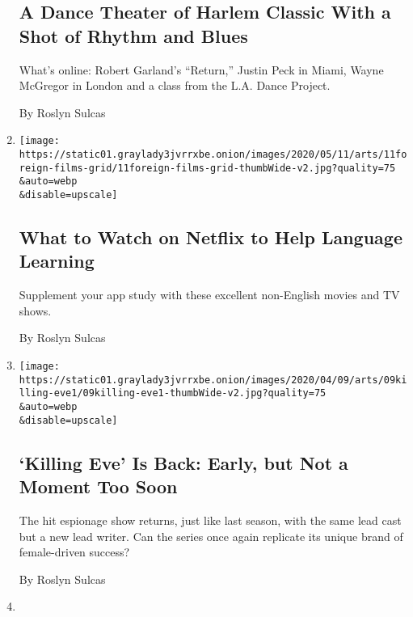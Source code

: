 \begin{enumerate}
  \hypertarget{a-dance-theater-of-harlem-classic-with-a-shot-of-rhythm-and-blues}{%
  \subsection{A Dance Theater of Harlem Classic With a Shot of Rhythm
  and
  Blues}\label{a-dance-theater-of-harlem-classic-with-a-shot-of-rhythm-and-blues}}

  What's online: Robert Garland's ``Return,'' Justin Peck in Miami,
  Wayne McGregor in London and a class from the L.A. Dance Project.

  By Roslyn Sulcas
\item
  \href{/2020/05/11/arts/television/netflix-foreign-films.html}{}

  \texttt{[image: https://static01.graylady3jvrrxbe.onion/images/2020/05/11/arts/11foreign-films-grid/11foreign-films-grid-thumbWide-v2.jpg?quality=75\\\&auto=webp\\\&disable=upscale]}

  \hypertarget{what-to-watch-on-netflix-to-help-language-learning}{%
  \subsection{What to Watch on Netflix to Help Language
  Learning}\label{what-to-watch-on-netflix-to-help-language-learning}}

  Supplement your app study with these excellent non-English movies and
  TV shows.

  By Roslyn Sulcas
\item
  \href{/2020/04/09/arts/television/killing-eve-season-3.html}{}

  \texttt{[image: https://static01.graylady3jvrrxbe.onion/images/2020/04/09/arts/09killing-eve1/09killing-eve1-thumbWide-v2.jpg?quality=75\\\&auto=webp\\\&disable=upscale]}

  \hypertarget{killing-eve-is-back-early-but-not-a-moment-too-soon}{%
  \subsection{`Killing Eve' Is Back: Early, but Not a Moment Too
  Soon}\label{killing-eve-is-back-early-but-not-a-moment-too-soon}}

  The hit espionage show returns, just like last season, with the same
  lead cast but a new lead writer. Can the series once again replicate
  its unique brand of female-driven success?

  By Roslyn Sulcas
\item
  \href{/2020/03/13/arts/design/pregnant-women-art.html}{}


\end{enumerate}
